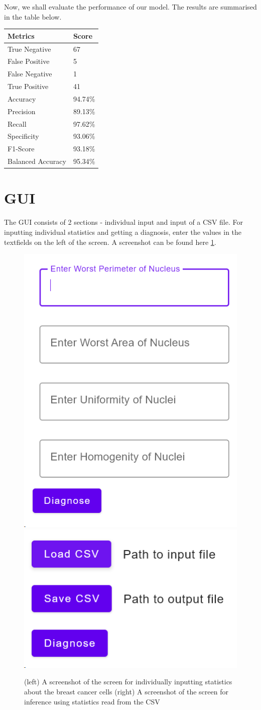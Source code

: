Now, we shall evaluate the performance of our model. The results are summarised in the table below.

\begin{center}
	\begin{tabular}{ | m{4cm} | m{2cm} | } 
		\hline
		Metrics & Score \\ 
		\hline
		True Negative & 67 \\
		\hline
		False Positive & 5 \\
		\hline
		False Negative & 1 \\
		\hline
		True Positive & 41 \\
		\hline
		Accuracy & 94.74\% \\
		\hline
		Precision & 89.13\% \\
		\hline 
		Recall & 97.62\% \\
		\hline 
		Specificity & 93.06\% \\
		\hline 
		F1-Score & 93.18\% \\
		\hline
		Balanced Accuracy & 95.34\% \\
		\hline 
	\end{tabular}
\end{center}

\section{GUI}
The GUI consists of 2 sections - individual input and input of a CSV file. For inputting individual statistics and getting a diagnosis, enter the values in the textfields on the left of the screen. A screenshot can be found here \ref{fig:screenshot}. \\

\begin{figure}[h]
	\centering
	\includegraphics[width=0.35\linewidth]{screenshot003}
	\hspace{0.5cm}
	\includegraphics[width=0.35\linewidth]{screenshot004}
        \caption{(left) A screenshot of the screen for individually inputting statistics about the breast cancer cells (right) A screenshot of the screen for inference using statistics read from the CSV}
	\label{fig:screenshot}
\end{figure}

